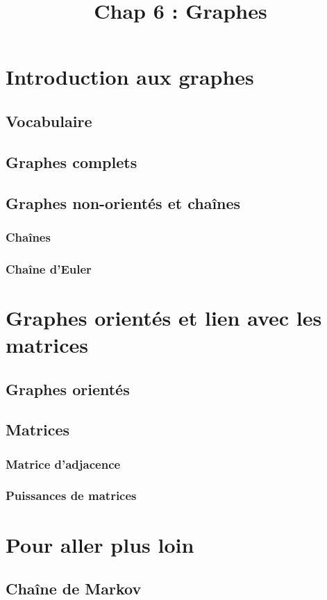 \documentclass{article}
\title{\vspace{-2em}\Huge{\textbf{Chap 6 : Graphes}}\vspace{-1.5em}}
\author{}
\date{}
\begin{document}
    \maketitle

    \section{Introduction aux graphes}
        \subsection{Vocabulaire}
        \subsection{Graphes complets}
        \subsection{Graphes non-orientés et chaînes}
            \subsubsection{Chaînes}
            \subsubsection{Chaîne d'Euler}


    \section{Graphes orientés et lien avec les matrices}
        \subsection{Graphes orientés}
        \subsection{Matrices}
            \subsubsection{Matrice d'adjacence}
            \subsubsection{Puissances de matrices}


    \section{Pour aller plus loin}
        \subsection{Chaîne de Markov}

\end{document}
